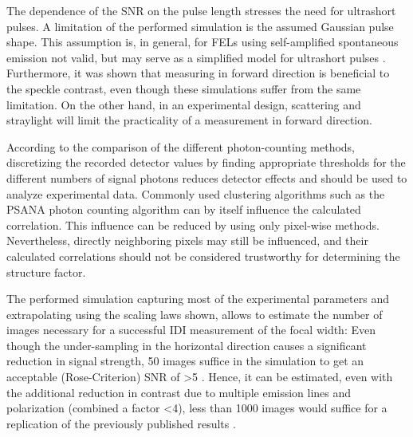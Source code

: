 The dependence of the SNR on the pulse length stresses the need for ultrashort pulses. A limitation of the performed simulation is the assumed Gaussian pulse shape. This assumption is, in general, for FELs using self-amplified spontaneous emission not valid, but may serve as a simplified model for ultrashort pulses \cite{inoue2019}. Furthermore, it was shown that measuring in forward direction is beneficial to the speckle contrast, even though these simulations suffer from the same limitation. On the other hand, in an experimental design, scattering and straylight will limit the practicality of a measurement in forward direction.

According to the comparison of the different photon-counting methods, discretizing the recorded detector values by finding appropriate thresholds for the different numbers of signal photons reduces detector effects and should be used to analyze experimental data. Commonly used clustering algorithms such as the PSANA photon counting algorithm can by itself influence the calculated correlation. This influence can be reduced by using only pixel-wise methods. Nevertheless, directly neighboring pixels may still be influenced, and their calculated correlations should not be considered trustworthy for determining the structure factor.


The performed simulation capturing most of the experimental parameters and extrapolating using the scaling laws shown, allows to estimate the number of images necessary for a successful IDI measurement of the focal width: Even though the under-sampling in the horizontal direction causes a significant reduction in signal strength, 50 images suffice in the simulation to get an acceptable (Rose-Criterion) SNR of >5 \cite{rose}. Hence, it can be estimated, even with the additional reduction in contrast due to multiple emission lines and polarization (combined a factor <4), less than 1000 images would suffice for a replication of the previously published results \cite{nakumura2020}.

